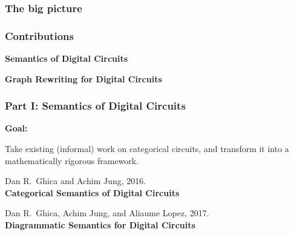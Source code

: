 \begin{frame}
    \frametitle{The big picture}



\end{frame}

\begin{frame}
    \frametitle{Contributions}



    \begin{center}
        \begin{minipage}{0.45\textwidth}
            \centering
            \textbf{Semantics of Digital Circuits}
        \end{minipage}
        \begin{minipage}{0.45\textwidth}
            \centering
            \textbf{Graph Rewriting for Digital Circuits}
        \end{minipage}
    \end{center}

\end{frame}

\begin{frame}
    \frametitle{Part I: Semantics of Digital Circuits}

    \LARGE
    \centering

    \textbf{Goal:}

    Take existing (informal) work on categorical circuits, and
    transform it into a mathematically rigorous framework.

    \normalsize

    \vspace{1em}

    Dan R.\ Ghica and Achim Jung, 2016. \\ \textbf{Categorical Semantics of Digital Circuits}

    Dan R.\ Ghica, Achim Jung, and Aliaume Lopez, 2017. \\ \textbf{Diagrammatic Semantics for Digital Circuits}


\end{frame}

